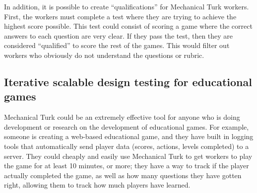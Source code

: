 \documentclass[12pt]{report}
\begin{document}
			In addition, it is possible to create ``qualifications'' for Mechanical Turk workers. First, the workers must complete a test where they are trying to achieve the highest score possible. This test could consist of scoring a game where the correct answers to each question are very clear. If they pass the test, then they are considered ``qualified'' to score the rest of the games. This would filter out workers who obviously do not understand the questions or rubric.

		\subsection{Iterative scalable design testing for educational games}
			
			Mechanical Turk could be an extremely effective tool for anyone who is doing development or research on the development of educational games. For example, someone is creating a web-based educational game, and they have built in logging tools that automatically send player data (scores, actions, levels completed) to a server. They could cheaply and easily use Mechanical Turk to get workers to play the game for at least 10 minutes, or more; they have a way to track if the player actually completed the game, as well as how many questions they have gotten right, allowing them to track how much players have learned.
\end{document}
